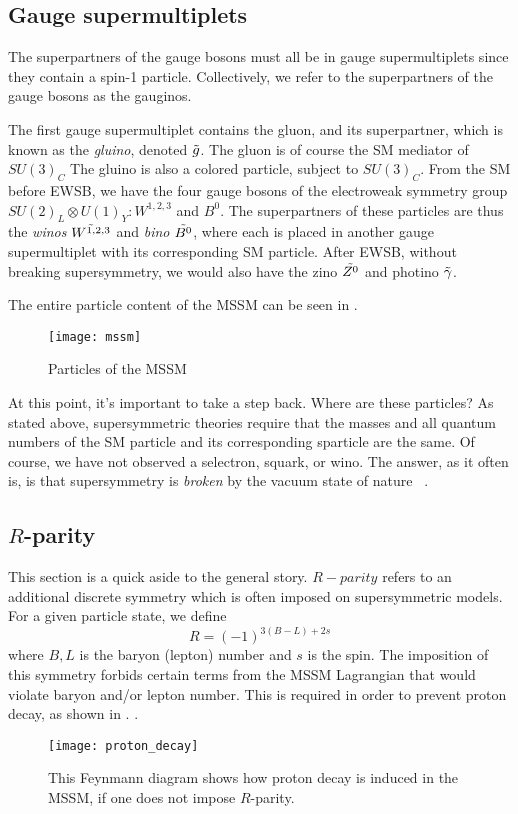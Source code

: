\subsection{Gauge supermultiplets}

The superpartners of the gauge bosons must all be in gauge supermultiplets since they contain a spin-1 particle.
Collectively, we refer to the superpartners of the gauge bosons as the gauginos.

The first gauge supermultiplet contains the gluon, and its superpartner, which is known as the \textit{gluino}, denoted $\tilde{g}$.
The gluon is of course the SM mediator of $SU(3)_C$
The gluino is also a colored particle, subject to $SU(3)_C$.
From the SM before EWSB, we have the four gauge bosons of the electroweak symmetry group $SU(2)_L \otimes U(1)_Y : W^{1,2,3}$ and $B^0$.
The superpartners of these particles are thus the \textit{winos} $\tilde{W^{1,2,3}}$ and \textit{bino} $\tilde{B^0}$, where each is placed in another gauge supermultiplet with its corresponding SM particle.
After EWSB, without breaking supersymmetry, we would also have the zino $\tilde{Z^0}$ and photino $\tilde{\gamma}$.

The entire particle content of the MSSM can be seen in .
\begin{figure}
\caption{Particles of the MSSM} \label{fig:mssm}
\texttt{[image: mssm]}
\end{figure}

At this point, it's important to take a step back.
Where are these particles?
As stated above, supersymmetric theories require that the masses and all quantum numbers of the SM particle and its corresponding sparticle are the same.
Of course, we have not observed a selectron, squark, or wino.
The answer, as it often is, is that supersymmetry is \textit{broken} by the vacuum state of nature ~\cite{susyPrimer}.

\subsection{$R$-parity}\label{sec:r_parity}

This section is a quick aside to the general story.
$R-parity$ refers to an additional discrete symmetry which is often imposed on supersymmetric models.
For a given particle state, we define
\begin{equation}
R = (-1)^{3(B-L) + 2s}
\end{equation}
where $B,L$ is the baryon (lepton) number and $s$ is the spin.
The imposition of this symmetry forbids certain terms from the MSSM Lagrangian that would violate baryon and/or lepton number.
This is required in order to prevent proton decay, as shown in \footnotemark.
.
\begin{figure}
\caption{This Feynmann diagram shows how proton decay is induced in the MSSM, if one does not impose $R$-parity.}\label{fig:proton_decay}
\texttt{[image: proton\_decay]}
\end{figure}

